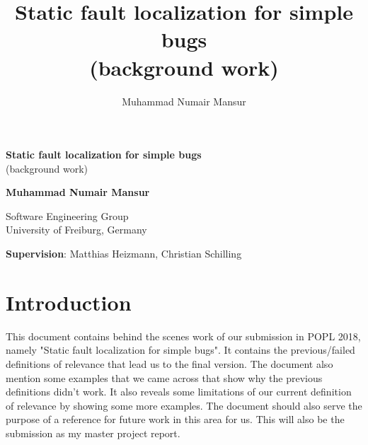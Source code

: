 \documentclass{article}
\title{Static fault localization for simple bugs \\ \normalsize{(background work)}}
\author{Muhammad Numair Mansur}
\affil{University of Freiburg, Germany}
\date{\vspace{-5ex}}
\begin{document}
\begin{titlepage}
    \begin{center}
        \vspace*{1cm}
        \Large
        \textbf{Static fault localization for simple bugs} \\
        \large
        (background work)
        \vspace{0.5cm}
   
        
        \vspace{5cm}
        \large
        \textbf{Muhammad Numair Mansur}
                
        \vspace{0.5cm}
        
        
        Software Engineering Group\\
        University of Freiburg, Germany
        
    \end{center}
    \vspace{8cm}
    \textbf{Supervision}: Matthias Heizmann, Christian Schilling
\end{titlepage}
\section{Introduction}
This document contains behind the scenes work of our submission in POPL 2018, namely "Static fault localization for simple bugs". It contains the previous/failed definitions of relevance that lead us to the final version. The document also mention some examples that we came across that show why the previous definitions didn't work. It also reveals some limitations of our current definition of relevance by showing some more examples. The document should also serve the purpose of a reference for future work in this area for us. This will also be the submission as my master project report.
\end{document}

